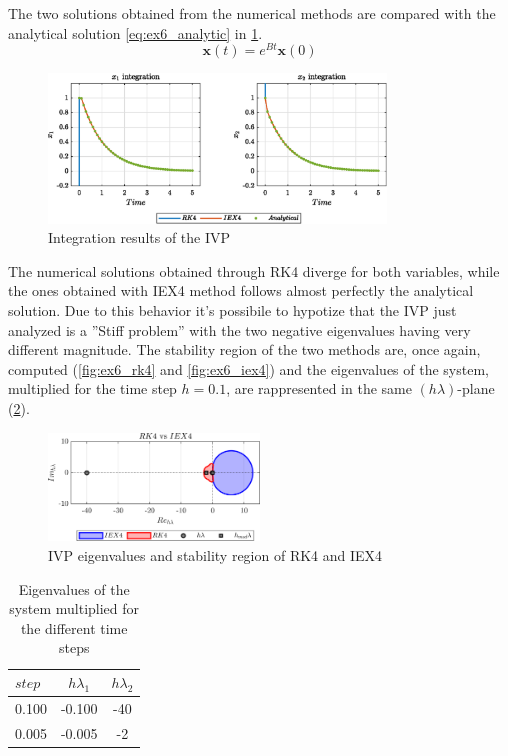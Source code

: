 \documentclass[11pt,a4paper,oneside]{article}
\renewcommand{\vec}[1]{\mathbf{#1}}
\begin{document}
The two solutions obtained from the numerical methods are compared with the analytical solution \cref{eq:ex6_analytic} in \cref{fig:ex6_integration}.
\begin{equation}
    \vec{x}(t) = e^{Bt}\vec{x}(0)
    \label{eq:ex6_analytic}
\end{equation}

\begin{figure}[htb]
    \centering
    \includegraphics*[width=0.8\textwidth, keepaspectratio]{ex6_integOutput.eps}
    \caption[]{\label{fig:ex6_integration} Integration results of the IVP}
\end{figure}

The numerical solutions obtained through RK4 diverge for both variables, while the ones obtained with IEX4 method follows almost perfectly the analytical solution.
Due to this behavior it's possibile to hypotize that the IVP just analyzed is a ''Stiff problem'' with the two negative eigenvalues having very different magnitude.
The stability region of the two methods are, once again, computed (\cref{fig:ex6_rk4} and \cref{fig:ex6_iex4}) and the eigenvalues of the system, multiplied for the time step $h=0.1$, are rappresented in the same $(h\lambda)$-plane (\cref{fig:ex6_stabReg}).  

\begin{figure}[htb]
    \centering
    \includegraphics*[width=0.5\textwidth, keepaspectratio]{ex6_stabReg.png}
    \caption[]{\label{fig:ex6_stabReg} IVP eigenvalues and stability region of RK4 and IEX4}
\end{figure}

\begin{table}[htb]
    \centering
    \caption{Eigenvalues of the system multiplied for the different time steps}
    \label{tab:ex6_eigs}
    \begin{tabular}{lcc}
            \toprule
            \toprule
            $step$&  $h\lambda_1$& $h\lambda_2$ \\ 
            \midrule
            0.100 & -0.100 & -40\\
            0.005 & -0.005 & -2\\
            \bottomrule
            \bottomrule
        \end{tabular}
\end{table}
\end{document}
